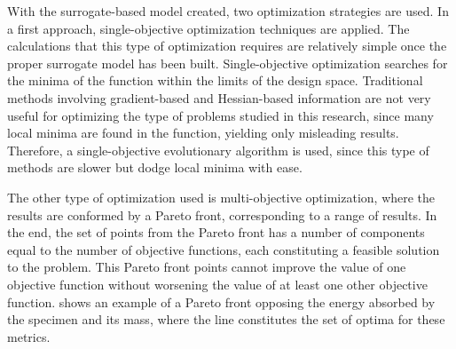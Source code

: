 \documentclass[cmfonts]{witpress}
\begin{document}

With the surrogate-based model created, two optimization strategies are used. In a first approach, single-objective optimization techniques are applied. The calculations that this type of optimization requires are relatively simple once the proper surrogate model has been built. Single-objective optimization searches for the minima of the function within the limits of the design space. Traditional methods involving gradient-based and Hessian-based information are not very useful for optimizing the type of problems studied in this research, since many local minima are found in the function, yielding only misleading results. Therefore, a single-objective evolutionary algorithm is used, since this type of methods are slower but dodge local minima with ease.






The other type of optimization used is multi-objective optimization, where the results are conformed by a Pareto front, corresponding to a range of results. In the end, the set of points from the Pareto front has a number of components equal to the number of objective functions, each constituting a feasible solution to the problem. This Pareto front points cannot improve the value of one objective function without worsening the value of at least one other objective function.  shows an example of a Pareto front opposing the energy absorbed by the specimen and its mass, where the line constitutes the set of optima for these metrics.
\end{document}
